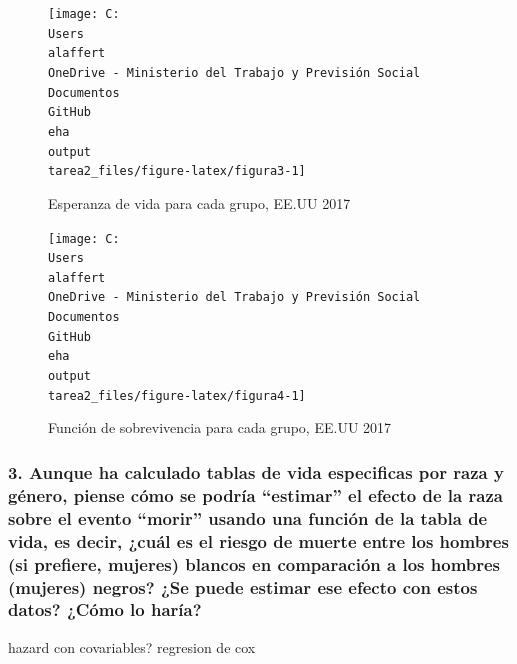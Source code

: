 \documentclass[
  12pt,
]{article}
\begin{document}
\begin{figure}

{\centering \texttt{[image: C:\\Users\\alaffert\\OneDrive - Ministerio del Trabajo y Previsión Social\\Documentos\\GitHub\\eha\\output\\tarea2\_files/figure-latex/figura3-1]} 

}

\caption{Esperanza de vida para cada grupo, EE.UU 2017}\label{fig:figura3}
\end{figure}

\begin{figure}

{\centering \texttt{[image: C:\\Users\\alaffert\\OneDrive - Ministerio del Trabajo y Previsión Social\\Documentos\\GitHub\\eha\\output\\tarea2\_files/figure-latex/figura4-1]} 

}

\caption{Función de sobrevivencia para cada grupo, EE.UU 2017}\label{fig:figura4}
\end{figure}

\newpage

\hypertarget{aunque-ha-calculado-tablas-de-vida-especificas-por-raza-y-guxe9nero-piense-cuxf3mo-se-podruxeda-estimar-el-efecto-de-la-raza-sobre-el-evento-morir-usando-una-funciuxf3n-de-la-tabla-de-vida-es-decir-cuuxe1l-es-el-riesgo-de-muerte-entre-los-hombres-si-prefiere-mujeres-blancos-en-comparaciuxf3n-a-los-hombres-mujeres-negros-se-puede-estimar-ese-efecto-con-estos-datos-cuxf3mo-lo-haruxeda}{%
\subsubsection{3. Aunque ha calculado tablas de vida especificas por
raza y género, piense cómo se podría ``estimar'' el efecto de la raza
sobre el evento ``morir'' usando una función de la tabla de vida, es
decir, ¿cuál es el riesgo de muerte entre los hombres (si prefiere,
mujeres) blancos en comparación a los hombres (mujeres) negros? ¿Se
puede estimar ese efecto con estos datos? ¿Cómo lo
haría?}\label{aunque-ha-calculado-tablas-de-vida-especificas-por-raza-y-guxe9nero-piense-cuxf3mo-se-podruxeda-estimar-el-efecto-de-la-raza-sobre-el-evento-morir-usando-una-funciuxf3n-de-la-tabla-de-vida-es-decir-cuuxe1l-es-el-riesgo-de-muerte-entre-los-hombres-si-prefiere-mujeres-blancos-en-comparaciuxf3n-a-los-hombres-mujeres-negros-se-puede-estimar-ese-efecto-con-estos-datos-cuxf3mo-lo-haruxeda}}

hazard con covariables? regresion de cox
\end{document}
